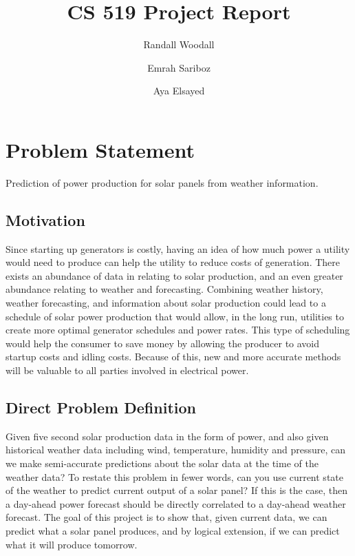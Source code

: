 \documentclass[sigconf]{acmart}
\begin{document}
\title{CS 519 Project Report}

\author{Randall Woodall}

\author{Emrah Sariboz}

\author{Aya Elsayed}

\maketitle

\section{Problem Statement}
Prediction of power production for solar panels from weather information.

\subsection{Motivation}
Since starting up generators is costly, having an idea of how much power a utility would need to produce can help the utility to reduce costs of generation.  There exists an abundance of data in relating to solar production, and an even greater abundance relating to weather and forecasting.  Combining weather history, weather forecasting, and information about solar production could lead to a schedule of solar power production that would allow, in the long run, utilities to create more optimal generator schedules and power rates.  This type of scheduling would help the consumer to save money by allowing the producer to avoid startup costs and idling costs.  Because of this, new and more accurate methods will be valuable to all parties involved in electrical power.


\subsection{Direct Problem Definition}
Given five second solar production data in the form of power, and also given historical weather data including wind, temperature, humidity and pressure, can we make semi-accurate predictions about the solar data at the time of the weather data?  To restate this problem in fewer words, can you use current state of the weather to predict current output of a solar panel? If this is the case, then a day-ahead power forecast should be directly correlated to a day-ahead weather forecast.  The goal of this project is to show that, given current data, we can predict what a solar panel produces, and by logical extension, if we can predict what it will produce tomorrow.
\end{document}
